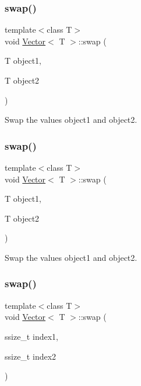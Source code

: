 \subsubsection{\texorpdfstring{swap()}{swap()}\hspace{0.1cm}{\footnotesize\ttfamily [1/4]}}
{\footnotesize\ttfamily template$<$class T$>$ \\
void \hyperlink{classVector}{Vector}$<$ T $>$\+::swap (\begin{DoxyParamCaption}\item[{T}]{object1,  }\item[{T}]{object2 }\end{DoxyParamCaption})\hspace{0.3cm}{\ttfamily [inline]}}

Swap the values object1 and object2. \mbox{\label{classVector_a7a46eb16510bb61368d2635d677a9c93}} 
\subsubsection{\texorpdfstring{swap()}{swap()}\hspace{0.1cm}{\footnotesize\ttfamily [2/4]}}
{\footnotesize\ttfamily template$<$class T$>$ \\
void \hyperlink{classVector}{Vector}$<$ T $>$\+::swap (\begin{DoxyParamCaption}\item[{T}]{object1,  }\item[{T}]{object2 }\end{DoxyParamCaption})\hspace{0.3cm}{\ttfamily [inline]}}

Swap the values object1 and object2. \mbox{\label{classVector_a42d2c65fb958b1cd850881c49c844e18}} 
\subsubsection{\texorpdfstring{swap()}{swap()}\hspace{0.1cm}{\footnotesize\ttfamily [3/4]}}
{\footnotesize\ttfamily template$<$class T$>$ \\
void \hyperlink{classVector}{Vector}$<$ T $>$\+::swap (\begin{DoxyParamCaption}\item[{ssize\+\_\+t}]{index1,  }\item[{ssize\+\_\+t}]{index2 }\end{DoxyParamCaption})\hspace{0.3cm}{\ttfamily [inline]}}


